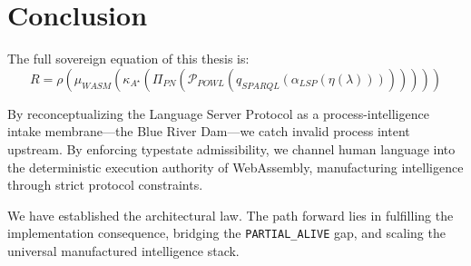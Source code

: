 
\chapter{Conclusion}
The full sovereign equation of this thesis is:
\begin{equation}
\boxed{R = \rho\left(\mu_{WASM}\left(\kappa_{A^\star}\left(\Pi_{PN}\left(\mathcal{P}_{POWL}\left(q_{SPARQL}\left(\alpha_{LSP}\left(\eta(\lambda)\right)\right)\right)\right)\right)\right)\right)}
\end{equation}

By reconceptualizing the Language Server Protocol as a process-intelligence intake membrane—the Blue River Dam—we catch invalid process intent upstream. By enforcing typestate admissibility, we channel human language into the deterministic execution authority of WebAssembly, manufacturing intelligence through strict protocol constraints.

We have established the architectural law. The path forward lies in fulfilling the implementation consequence, bridging the \texttt{PARTIAL\_ALIVE} gap, and scaling the universal manufactured intelligence stack.
